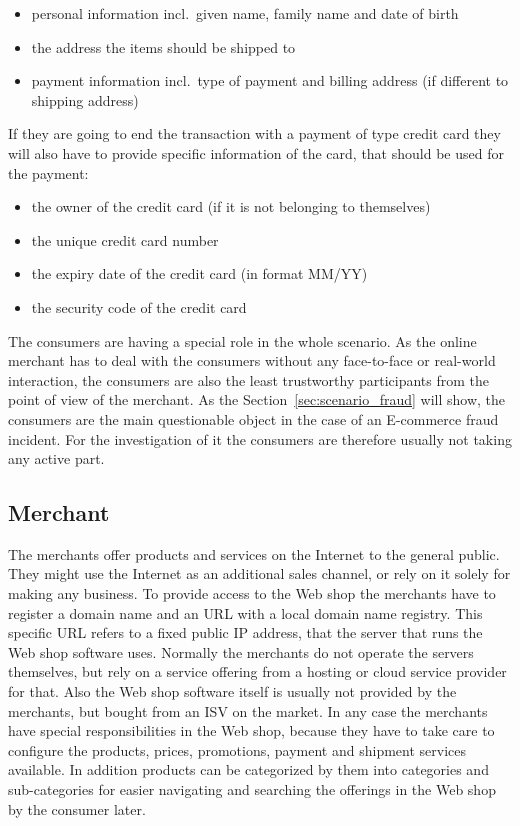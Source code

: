 \begin{itemize}
		\item personal information incl.\ given name, family name and date of birth
		\item the address the items should be shipped to
		\item payment information incl.\ type of payment and billing address (if different to shipping address)
\end{itemize}

If they are going to end the transaction with a payment of type credit card they will also have to provide specific information of the card, that should be used for the payment:\@

\begin{itemize}
		\item the owner of the credit card (if it is not belonging to themselves)
		\item the unique credit card number
		\item the expiry date of the credit card (in format MM/YY)
		\item the security code of the credit card
\end{itemize}

The consumers are having a special role in the whole scenario. As the online merchant has to deal with the consumers without any face-to-face or real-world interaction, the consumers are also the least trustworthy participants from the point of view of the merchant. As the Section~\ref{sec:scenario_fraud} will show, the consumers are the main questionable object in the case of an \gls{E-commerce} fraud incident. For the investigation of it the consumers are therefore usually not taking any active part.


\subsection{Merchant}
\label{subsec:stakeholder_merchant}

The merchants offer products and services on the Internet to the general public. They might use the Internet as an additional sales channel, or rely on it solely for making any business. To provide access to the Web shop the merchants have to register a domain name and an \gls{URL} with a local domain name registry. This specific \gls{URL} refers to a fixed public \gls{IP} address, that the server that runs the Web shop software uses. Normally the merchants do not operate the servers themselves, but rely on a service offering from a hosting or cloud service provider for that. Also the Web shop software itself is usually not provided by the merchants, but bought from an \gls{ISV} on the market. In any case the merchants have special responsibilities in the Web shop, because they have to take care to configure the products, prices, promotions, payment and shipment services available. In addition products can be categorized by them into categories and sub-categories for easier navigating and searching the offerings in the Web shop by the consumer later. \\


